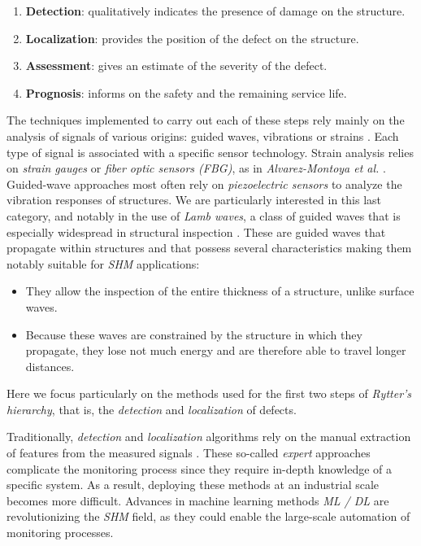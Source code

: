 \documentclass[12pt]{article}
\begin{document}
\begin{enumerate}
 
    \item \textbf{Detection}: qualitatively indicates the presence of damage on the structure.
    \item \textbf{Localization}: provides the position of the defect on the structure.
    \item \textbf{Assessment}: gives an estimate of the severity of the defect.
    \item \textbf{Prognosis}: informs on the safety and the remaining service life.
    
\end{enumerate}
 
The techniques implemented to carry out each of these steps rely mainly on the analysis of signals of various origins: guided waves, vibrations or strains \cite{SPENCER2025100203, Khatir2025}. Each type of signal is associated with a specific sensor technology. Strain analysis relies on \textit{strain gauges} or \textit{fiber optic sensors (FBG)}, as in \textit{Alvarez-Montoya et al.} \cite{ALVAREZMONTOYA2020106526}. Guided-wave approaches most often rely on \textit{piezoelectric sensors} to analyze the vibration responses of structures. We are particularly interested in this last category, and notably in the use of \textit{Lamb waves}, a class of guided waves that is especially widespread in structural inspection \cite{SAWANT2023106931, ZHANG2021107107}. These are guided waves that propagate within structures and that possess several characteristics making them notably suitable for \textit{SHM} applications:
 
\begin{itemize}[itemsep=8pt]
 
    \item They allow the inspection of the entire thickness of a structure, unlike surface waves.
 
    \item Because these waves are constrained by the structure in which they propagate, they lose not much energy and are therefore able to travel longer distances.
    
\end{itemize}
 
Here we focus particularly on the methods used for the first two steps of \textit{Rytter's hierarchy}, that is, the \textit{detection} and \textit{localization} of defects. 
 
Traditionally, \textit{detection} and \textit{localization} algorithms rely on the manual extraction of features from the measured signals \cite{ZHANG2021107107, SAWANT2023106931}. These so-called \textit{expert} approaches complicate the monitoring process since they require in-depth knowledge of a specific system. As a result, deploying these methods at an industrial scale becomes more difficult. Advances in machine learning methods \textit{ML / DL} are revolutionizing the \textit{SHM} field, as they could enable the large-scale automation of monitoring processes. 
\end{document}
